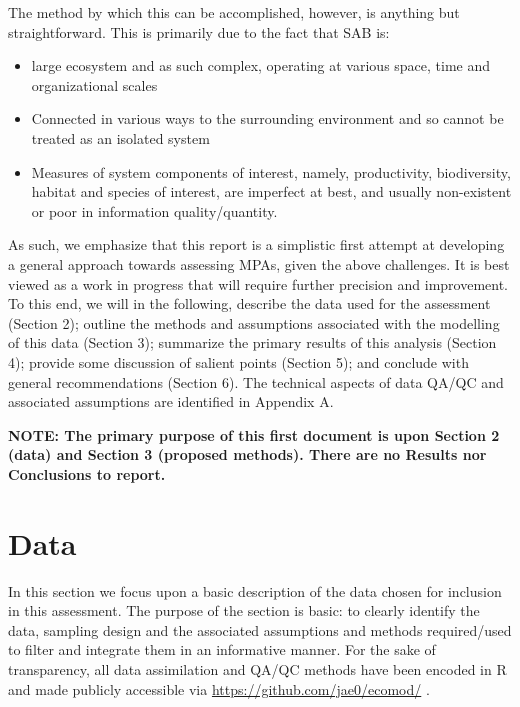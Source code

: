 \documentclass[letterpaper,portrait,11pt]{scrartcl}
\numberwithin{equation}{section}		%
\numberwithin{figure}{section}			%
\numberwithin{table}{section}				%
\begin{document}
The method by which this can be accomplished, however, is anything but straightforward. This is primarily due to the fact that SAB is:

\begin{itemize}
	\item large ecosystem and as such complex, operating at various space, time and organizational scales
	\item Connected in various ways to the surrounding environment and so cannot be treated as an isolated system
	\item Measures of system components of interest, namely, productivity, biodiversity, habitat and species of interest, are imperfect at best, and usually non-existent or poor in information quality/quantity.
\end{itemize}

As such, we emphasize that this report is a simplistic first attempt at developing a general approach towards assessing MPAs, given the above challenges. It is best viewed as a work in progress that will require further precision and improvement.
To this end, we will in the following, describe the data used for the assessment (Section 2); outline the methods and assumptions associated with the modelling of this data (Section 3); summarize the primary results of this analysis (Section 4); provide some discussion of salient points (Section 5); and conclude with general recommendations (Section 6). The technical aspects of data QA/QC and associated assumptions are identified in Appendix A. 

\medskip

\textbf{NOTE: The primary purpose of this first document is upon Section 2 (data) and Section 3 (proposed methods). There are no Results nor Conclusions to report. }

\section{Data} 
In this section we focus upon a basic description of the data chosen for inclusion in this assessment. The purpose of the section is basic: to clearly identify the data, sampling design and the associated assumptions and methods required/used to filter and integrate them in an informative manner. For the sake of transparency, all data assimilation and QA/QC methods have been encoded in R \cite{rCran} and made publicly accessible via \url{https://github.com/jae0/ecomod/} . 
\end{document}
